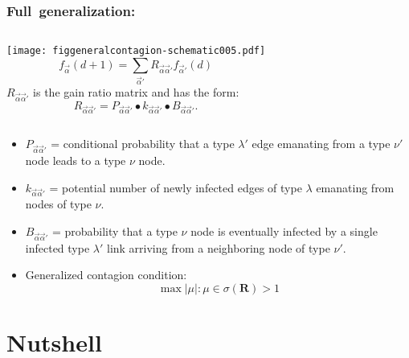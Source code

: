 \begin{frame}
  \frametitle{Full\ generalization:}

  \begin{columns}
    \texttt{[image: figgeneralcontagion-schematic005.pdf]}
    $$
    f_{\vec{\alpha}}(d+1) 
    = 
    \sum_{\vec{\alpha}'}
    R_{\vec{\alpha} \vec{\alpha}'}
    f_{\vec{\alpha}'}(d)
    $$
    $
    R_{\vec{\alpha} \vec{\alpha}'}
    $
    is the gain ratio matrix
    and has the form:
    $$
    R_{\vec{\alpha} \vec{\alpha}'}
    =
    P_{\vec{\alpha} \vec{\alpha}'}
    \bullet
    k_{\vec{\alpha} \vec{\alpha}'}
    \bullet
    B_{\vec{\alpha} \vec{\alpha}'}.
    $$
  \end{columns}

  \begin{itemize}
  \item<2->
    $P_{\vec{\alpha} \vec{\alpha}'}$
    = conditional probability that
    a type $\lambda'$ edge emanating from a type $\nu'$ 
    node leads to a type $\nu$ node.
  \item<3->
    $k_{\vec{\alpha} \vec{\alpha}'}$
    = potential  number of newly 
    infected edges of type $\lambda$ 
    emanating from nodes of type $\nu$.
  \item<4->
    $B_{\vec{\alpha} \vec{\alpha}'}$
    = probability that
    a type $\nu$ node is eventually infected by
    a single infected type $\lambda'$ link arriving from a 
    neighboring node of type $\nu'$.
  \item<5->
    Generalized contagion condition:
    $$
    \max{|\mu|} : 
    \mu 
    \in 
    \sigma
    \left(
      \mathbf{R}
    \right)  
    > 1
    $$
  \end{itemize}

  
\end{frame}



\section{Nutshell}

